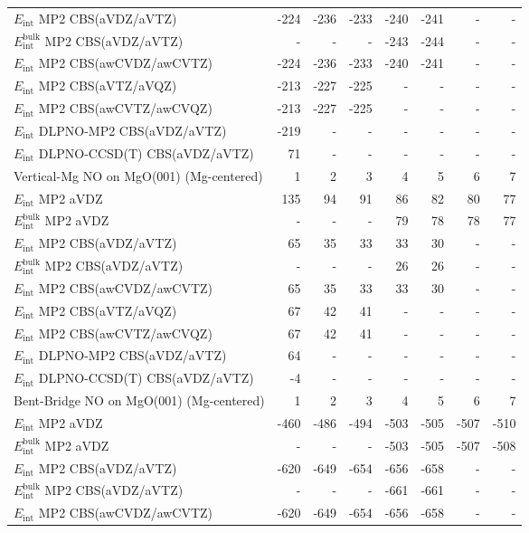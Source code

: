 \begin{longtable}{lrrrrrrr}
$E_\text{int}$ MP2 CBS(aVDZ/aVTZ) & -224 & -236 & -233 & -240 & -241 & - & - \\
$E_\text{int}^\text{bulk}$ MP2 CBS(aVDZ/aVTZ) & - & - & - & -243 & -244 & - & - \\
$E_\text{int}$ MP2 CBS(awCVDZ/awCVTZ) & -224 & -236 & -233 & -240 & -241 & - & - \\
$E_\text{int}$ MP2 CBS(aVTZ/aVQZ) & -213 & -227 & -225 & - & - & - & - \\
$E_\text{int}$ MP2 CBS(awCVTZ/awCVQZ) & -213 & -227 & -225 & - & - & - & - \\
$E_\text{int}$ DLPNO-MP2 CBS(aVDZ/aVTZ) & -219 & - & - & - & - & - & - \\
$E_\text{int}$ DLPNO-CCSD(T) CBS(aVDZ/aVTZ) & 71 & - & - & - & - & - & - \\
\toprule
Vertical-Mg NO on MgO(001) (Mg-centered) & 1 & 2 & 3 & 4 & 5 & 6 & 7 \\ 
\midrule
$E_\text{int}$ MP2 aVDZ & 135 & 94 & 91 & 86 & 82 & 80 & 77 \\
$E_\text{int}^\text{bulk}$ MP2 aVDZ & - & - & - & 79 & 78 & 78 & 77 \\
$E_\text{int}$ MP2 CBS(aVDZ/aVTZ) & 65 & 35 & 33 & 33 & 30 & - & - \\
$E_\text{int}^\text{bulk}$ MP2 CBS(aVDZ/aVTZ) & - & - & - & 26 & 26 & - & - \\
$E_\text{int}$ MP2 CBS(awCVDZ/awCVTZ) & 65 & 35 & 33 & 33 & 30 & - & - \\
$E_\text{int}$ MP2 CBS(aVTZ/aVQZ) & 67 & 42 & 41 & - & - & - & - \\
$E_\text{int}$ MP2 CBS(awCVTZ/awCVQZ) & 67 & 42 & 41 & - & - & - & - \\
$E_\text{int}$ DLPNO-MP2 CBS(aVDZ/aVTZ) & 64 & - & - & - & - & - & - \\
$E_\text{int}$ DLPNO-CCSD(T) CBS(aVDZ/aVTZ) & -4 & - & - & - & - & - & - \\
\toprule
Bent-Bridge NO on MgO(001) (Mg-centered) & 1 & 2 & 3 & 4 & 5 & 6 & 7 \\ 
\midrule
$E_\text{int}$ MP2 aVDZ & -460 & -486 & -494 & -503 & -505 & -507 & -510 \\
$E_\text{int}^\text{bulk}$ MP2 aVDZ & - & - & - & -503 & -505 & -507 & -508 \\
$E_\text{int}$ MP2 CBS(aVDZ/aVTZ) & -620 & -649 & -654 & -656 & -658 & - & - \\
$E_\text{int}^\text{bulk}$ MP2 CBS(aVDZ/aVTZ) & - & - & - & -661 & -661 & - & - \\
$E_\text{int}$ MP2 CBS(awCVDZ/awCVTZ) & -620 & -649 & -654 & -656 & -658 & - & - \\

\end{longtable}
